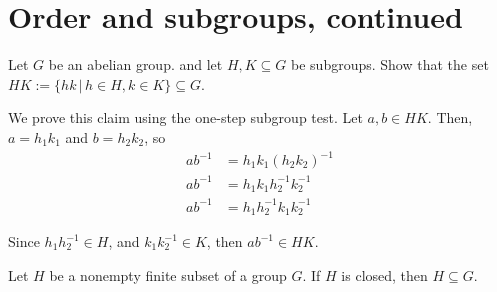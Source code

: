 \section{Order and subgroups, continued}
    \renewcommand{\leftmark}{February 26, 2024}

    \begin{example}
        Let \(G\) be an abelian group. and let \(H,K \subseteq G\) be subgroups. Show that the set \(HK := \big\{hk \,\big|\,h\in H, k\in K\big\} \subseteq G\).

        We prove this claim using the one-step subgroup test. Let \(a,b\in HK\). Then, \(a = h_1k_1\) and \(b = h_2k_2\), so
        \begin{align*}
            ab^{-1} &= h_1k_1(h_2k_2)^{-1} \\
            ab^{-1} &= h_1k_1h_2^{-1}k_2^{-1} \\
            ab^{-1} &= h_1h_2^{-1}k_1k_2^{-1}
        \end{align*}

        Since \(h_1h_2^{-1} \in H\), and \(k_1k_2^{-1} \in K\), then \(ab^{-1} \in HK\).
    \end{example}

    \begin{thm}
        Let \(H\) be a nonempty finite subset of a group \(G\). If \(H\) is closed, then \(H \subseteq G\).
    \end{thm}

